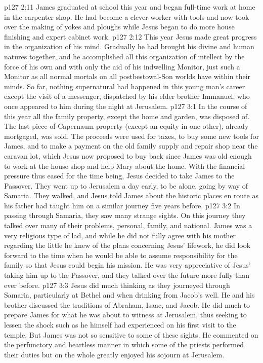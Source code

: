 \vs p127 2:11 \pc James graduated at school this year and began full\hyp{}time work at home in the carpenter shop. He had become a clever worker with tools and now took over the making of yokes and ploughs while Jesus began to do more house finishing and expert cabinet work.
\vs p127 2:12 \pc This year Jesus made great progress in the organization of his mind. Gradually he had brought his divine and human natures together, and he accomplished all this organization of intellect by the force of his own  and with only the aid of his indwelling Monitor, just such a Monitor as all normal mortals on all postbestowal\hyp{}Son worlds have within their minds. So far, nothing supernatural had happened in this young man’s career except the visit of a messenger, dispatched by his elder brother Immanuel, who once appeared to him during the night at Jerusalem.
\vs p127 3:1 In the course of this year all the family property, except the home and garden, was disposed of. The last piece of Capernaum property (except an equity in one other), already mortgaged, was sold. The proceeds were used for taxes, to buy some new tools for James, and to make a payment on the old family supply and repair shop near the caravan lot, which Jesus now proposed to buy back since James was old enough to work at the house shop and help Mary about the home. With the financial pressure thus eased for the time being, Jesus decided to take James to the Passover. They went up to Jerusalem a day early, to be alone, going by way of Samaria. They walked, and Jesus told James about the historic places en route as his father had taught him on a similar journey five years before.
\vs p127 3:2 In passing through Samaria, they saw many strange sights. On this journey they talked over many of their problems, personal, family, and national. James was a very religious type of lad, and while he did not fully agree with his mother regarding the little he knew of the plans concerning Jesus’ lifework, he did look forward to the time when he would be able to assume responsibility for the family so that Jesus could begin his mission. He was very appreciative of Jesus’ taking him up to the Passover, and they talked over the future more fully than ever before.
\vs p127 3:3 Jesus did much thinking as they journeyed through Samaria, particularly at Bethel and when drinking from Jacob’s well. He and his brother discussed the traditions of Abraham, Isaac, and Jacob. He did much to prepare James for what he was about to witness at Jerusalem, thus seeking to lessen the shock such as he himself had experienced on his first visit to the temple. But James was not so sensitive to some of these sights. He commented on the perfunctory and heartless manner in which some of the priests performed their duties but on the whole greatly enjoyed his sojourn at Jerusalem.
